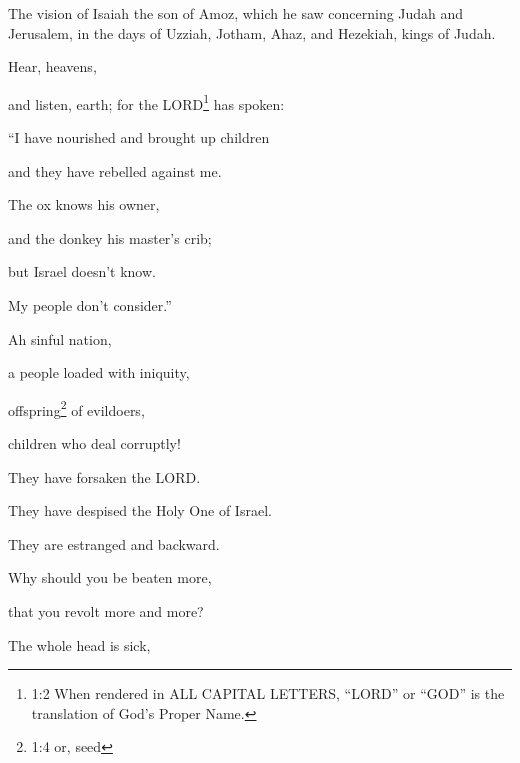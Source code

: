 
\newpage
\null
\thispagestyle{empty}
\newpage







\vspace{-1.36in}


\mychapter{} \myverse*{}The vision of Isaiah the son of Amoz, which he saw concerning Judah
and Jerusalem, in the days of Uzziah, Jotham, Ahaz, and Hezekiah, kings of Judah.

\myverse{}Hear, heavens,

and listen, earth; for the LORD\footnote{1:2 When rendered in ALL CAPITAL LETTERS, “LORD” or “GOD” is the translation of God’s Proper Name.}
has spoken:

“I have nourished and brought up children

and they have rebelled against me.

\myverse{}The ox knows his owner,

and the donkey his master’s crib;

but Israel doesn’t know.

My people don’t consider.”

\myverse{}Ah sinful nation,

a people loaded with iniquity,

offspring\footnote{1:4 or, seed} of evildoers,

children who deal corruptly!

They have forsaken the LORD.

They have despised the Holy One of Israel.

They are estranged and backward.

\myverse{}Why should you be beaten more,

that you revolt more and more?

The whole head is sick,

